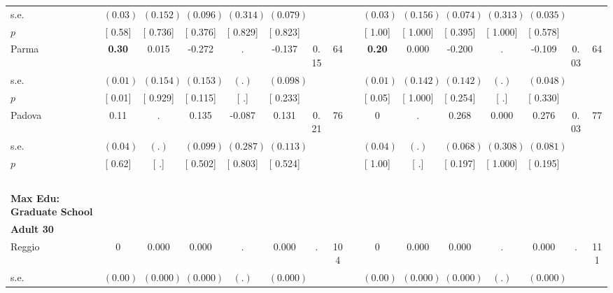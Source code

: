 \begin{longtable}{L{8em} c c c c c c c p{1em} c c c c c c c}
\quad \quad \quad \quad s.e.& $ (     0.03)$ & $ (    0.152)$ & $ (    0.096)$ & $ (    0.314)$ & $ (    0.079)$ & & & & $ (     0.03)$ & $ (    0.156)$ & $ (    0.074)$ & $ (    0.313)$ & $ (    0.035)$ & &  \\*
\quad \quad \quad \quad $ p$ & [     0.58] & [    0.736] & [    0.376] & [    0.829] & [    0.823] & & & & [     1.00] & [    1.000] & [    0.395] & [    1.000] & [    0.578] & &  \\[1em]
\quad \quad \quad Parma& \textbf{     0.30} &     0.015 &    -0.272 &         . &    -0.137 &      0.15 &        64 & & \textbf{     0.20} &     0.000 &    -0.200 &         . &    -0.109 &      0.03 &        64  \\*
\quad \quad \quad \quad s.e.& $ (     0.01)$ & $ (    0.154)$ & $ (    0.153)$ & $ (        .)$ & $ (    0.098)$ & & & & $ (     0.01)$ & $ (    0.142)$ & $ (    0.142)$ & $ (        .)$ & $ (    0.048)$ & &  \\*
\quad \quad \quad \quad $ p$ & [     0.01] & [    0.929] & [    0.115] & [        .] & [    0.233] & & & & [     0.05] & [    1.000] & [    0.254] & [        .] & [    0.330] & &  \\[1em]
\quad \quad \quad Padova& 0.11 &         . &     0.135 &    -0.087 &     0.131 &      0.21 &        76 & & 0 &         . &     0.268 &     0.000 &     0.276 &      0.03 &        77  \\*
\quad \quad \quad \quad s.e.& $ (     0.04)$ & $ (        .)$ & $ (    0.099)$ & $ (    0.287)$ & $ (    0.113)$ & & & & $ (     0.04)$ & $ (        .)$ & $ (    0.068)$ & $ (    0.308)$ & $ (    0.081)$ & &  \\*
\quad \quad \quad \quad $ p$ & [     0.62] & [        .] & [    0.502] & [    0.803] & [    0.524] & & & & [     1.00] & [        .] & [    0.197] & [    1.000] & [    0.195] & &  \\[1em]
~\\[1em]
\textbf{Max Edu: Graduate School} \\*
\quad \quad \textbf{Adult 30} & & & & & & & & & & & & & & & \\* 
\quad \quad \quad Reggio& 0 &     0.000 &     0.000 &         . &     0.000 &         . &       104 & & 0 &     0.000 &     0.000 &         . &     0.000 &         . &       111  \\*
\quad \quad \quad \quad s.e.& $ (     0.00)$ & $ (    0.000)$ & $ (    0.000)$ & $ (        .)$ & $ (    0.000)$ & & & & $ (     0.00)$ & $ (    0.000)$ & $ (    0.000)$ & $ (        .)$ & $ (    0.000)$ & &  \\*

\end{longtable}
